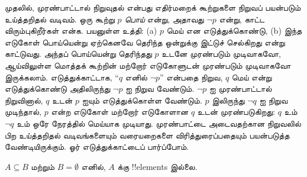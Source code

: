 \documentclass[../../../include/open-logic-section]{subfiles}
\begin{document}


முதலில், முரண்பாட்டால் நிறுவுதல் என்பது எதிர்மறைக் கூற்றுகளை
நிறுவப் பயன்படும் உய்த்தறிதல் வடிவம். ஒரு கூற்று $p$
\emph{பொய்} என்று, அதாவது $\lnot p$ என்று, காட்ட
விரும்புகிறீர்கள் என்க. பயனுள்ள உத்தி: (a) $p$ மெய்
என எடுத்துக்கொண்டு, (b) இந்த எடுகோள் பொய்யென்று
ஏற்கெனவே தெரிந்த ஒன்றுக்கு இட்டுச் செல்கிறது என்று
காட்டுவது. அந்தப் பொய்யென்று தெரிந்தது $p$ உடனே
முரண்படும் முடிவாகவோ, ஆய்விலுள்ள மொத்தக் கூற்றின்
மற்றோர் எடுகோளுடன் முரண்படும் முடிவாகவோ இருக்கலாம்.
எடுத்துக்காட்டாக, ``$q$ எனில் $\lnot p$'' என்பதை
நிறுவ, $q$ மெய் என்று எடுத்துக்கொண்டு அதிலிருந்து
$\lnot p$ ஐ நிறுவ வேண்டும். $\lnot p$ ஐ
முரண்பாட்டால் நிறுவினால், $q$ உடன் $p$ ஐயும்
எடுத்துக்கொள்ள வேண்டும். $p$ இலிருந்து $\lnot q$
ஐ நிறுவ முடிந்தால், $p$ என்ற எடுகோள் மற்றோர்
எடுகோளான $q$ உடன் முரண்படுகிறது: $q$ உம்
$\lnot q$ உம் ஒரே நேரத்தில் மெய்யாக முடியாது.
முரண்பாட்டை அடைவதற்கான நிறுவலில் பிற உய்த்தறிதல்
வடிவங்களையும் வரையறைகளை விரித்துரைப்பதையும் பயன்படுத்த
வேண்டியிருக்கும். ஓர் எடுத்துக்காட்டைப் பார்ப்போம்.

\begin{prop}
  $A \subseteq B$ மற்றும் $B = \emptyset$ எனில்,
  $A$ க்கு !!{element}s இல்லை.
\end{prop}
\end{document}
